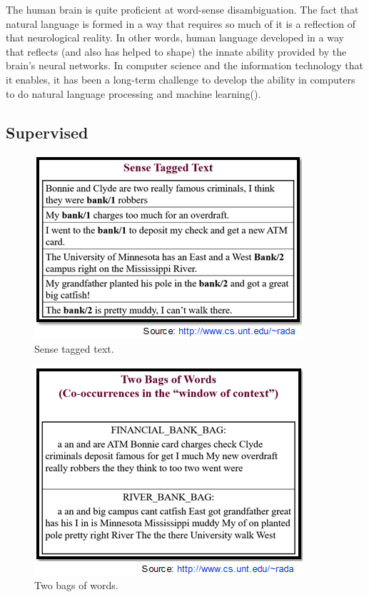 The human brain is quite proficient at word-sense disambiguation. The fact that natural language is formed in a way that requires so much of it is a reflection of that neurological reality. In other words, human language developed in a way that reflects (and also has helped to shape) the innate ability provided by the brain's neural networks. In computer science and the information technology that it enables, it has been a long-term challenge to develop the ability in computers to do natural language processing and machine learning(\cite{DBLP:journals/jis/NaT09}).

\subsection*{Supervised}

\begin{figure}[tbh]
	\begin{center}
		\includegraphics[width=\columnwidth]{union(sup1)}
	\end{center}
	\caption{Sense tagged text.}
\end{figure}
\begin{figure}[tbh]
	\begin{center}
		\includegraphics[width=\columnwidth]{union(sup2)}
	\end{center}
	\caption{Two bags of words.}
\end{figure}
